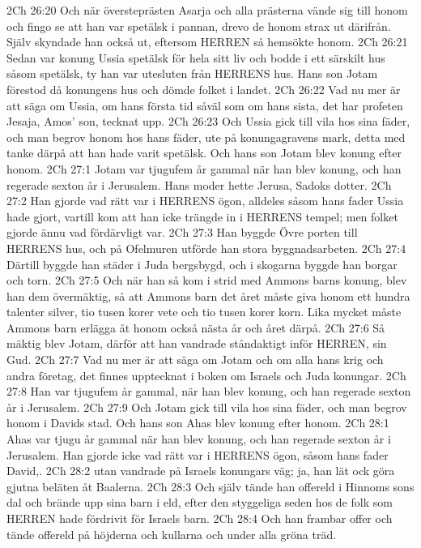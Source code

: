 2Ch 26:20  Och när översteprästen Asarja och alla prästerna vände sig till honom och fingo se att han var spetälsk i pannan, drevo de honom strax ut därifrån. Själv skyndade han också ut, eftersom HERREN så hemsökte honom.
2Ch 26:21  Sedan var konung Ussia spetälsk för hela sitt liv och bodde i ett särskilt hus såsom spetälsk, ty han var utesluten från HERRENS hus. Hans son Jotam förestod då konungens hus och dömde folket i landet.
2Ch 26:22  Vad nu mer är att säga om Ussia, om hans första tid såväl som om hans sista, det har profeten Jesaja, Amos' son, tecknat upp.
2Ch 26:23  Och Ussia gick till vila hos sina fäder, och man begrov honom hos hans fäder, ute på konungagravens mark, detta med tanke därpå att han hade varit spetälsk. Och hans son Jotam blev konung efter honom.
2Ch 27:1  Jotam var tjugufem år gammal när han blev konung, och han regerade sexton år i Jerusalem. Hans moder hette Jerusa, Sadoks dotter.
2Ch 27:2  Han gjorde vad rätt var i HERRENS ögon, alldeles såsom hans fader Ussia hade gjort, vartill kom att han icke trängde in i HERRENS tempel; men folket gjorde ännu vad fördärvligt var.
2Ch 27:3  Han byggde Övre porten till HERRENS hus, och på Ofelmuren utförde han stora byggnadsarbeten.
2Ch 27:4  Därtill byggde han städer i Juda bergsbygd, och i skogarna byggde han borgar och torn.
2Ch 27:5  Och när han så kom i strid med Ammons barns konung, blev han dem övermäktig, så att Ammons barn det året måste giva honom ett hundra talenter silver, tio tusen korer vete och tio tusen korer korn. Lika mycket måste Ammons barn erlägga åt honom också nästa år och året därpå.
2Ch 27:6  Så mäktig blev Jotam, därför att han vandrade ståndaktigt inför HERREN, sin Gud.
2Ch 27:7  Vad nu mer är att säga om Jotam och om alla hans krig och andra företag, det finnes upptecknat i boken om Israels och Juda konungar.
2Ch 27:8  Han var tjugufem år gammal, när han blev konung, och han regerade sexton år i Jerusalem.
2Ch 27:9  Och Jotam gick till vila hos sina fäder, och man begrov honom i Davids stad. Och hans son Ahas blev konung efter honom.
2Ch 28:1  Ahas var tjugu år gammal när han blev konung, och han regerade sexton år i Jerusalem. Han gjorde icke vad rätt var i HERRENS ögon, såsom hans fader David,.
2Ch 28:2  utan vandrade på Israels konungars väg; ja, han lät ock göra gjutna beläten åt Baalerna.
2Ch 28:3  Och själv tände han offereld i Hinnoms sons dal och brände upp sina barn i eld, efter den styggeliga seden hos de folk som HERREN hade fördrivit för Israels barn.
2Ch 28:4  Och han frambar offer och tände offereld på höjderna och kullarna och under alla gröna träd.

